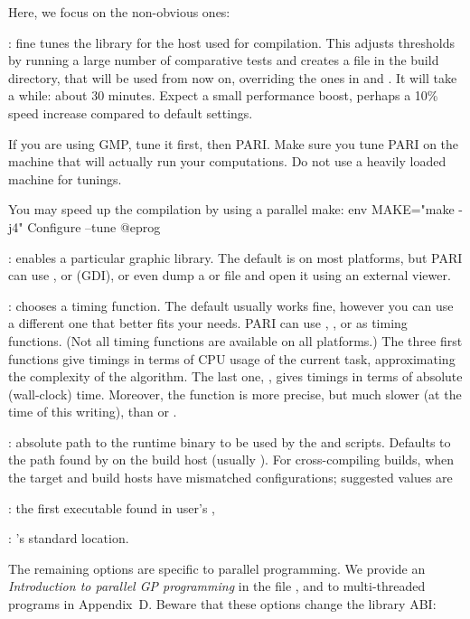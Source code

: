 Here, we focus on the non-obvious ones:

: fine tunes the library for the host used for compilation. This
adjusts thresholds by running a large number of comparative tests and creates
a file  in the build directory, that will be used from now on,
overriding the ones in  and . It
will take a while: about 30 minutes. Expect a small
performance boost, perhaps a 10\% speed increase
compared to default settings.

If you are using GMP, tune it first, then PARI. Make sure you tune PARI on
the machine that will actually run your computations. Do not use a heavily
loaded machine for tunings.

You may speed up the compilation by using a parallel make:
\bprog
  env MAKE="make -j4" Configure --tune
@eprog

: enables a particular graphic library.
The default is  on most platforms, but PARI can use
,  or  (GDI), or even dump a 
or  file and open it using an external viewer.

: chooses a timing function. The default usually
works fine, however you can use a different one that better fits your needs.
PARI can use , ,  or
 as timing functions. (Not all timing functions are available on
all platforms.) The three first functions give timings in terms of CPU usage
of the current task, approximating the complexity of the algorithm. The last
one, , gives timings in terms of absolute (wall-clock) time.
Moreover, the  function is more precise, but much slower
(at the time of this writing), than  or .

: absolute path to the runtime 
binary to be used by the  and  scripts. Defaults
to the path found by  on the build host (usually
). For cross-compiling builds, when the target and build
hosts have mismatched configurations; suggested values are

: the first  executable found in user's
,

: 's standard location.

The remaining options are specific to parallel programming. We provide an
\emph{Introduction to parallel GP programming} in the file
, and to multi-threaded  programs
in Appendix~D. Beware that these options change the library ABI:

